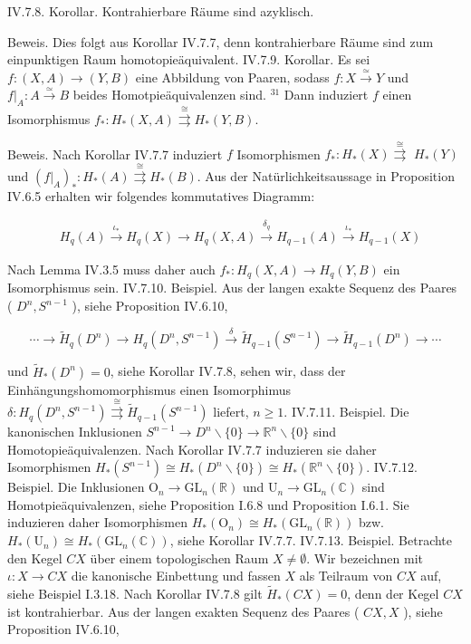 \documentclass[10pt, letterpaper]{article}
\begin{document}
IV.7.8. Korollar. Kontrahierbare Räume sind azyklisch.

Beweis. Dies folgt aus Korollar IV.7.7, denn kontrahierbare Räume sind zum einpunktigen Raum homotopieäquivalent.
IV.7.9. Korollar. Es sei $f:(X, A) \rightarrow(Y, B)$ eine Abbildung von Paaren, sodass $f: X \xrightarrow{\simeq} Y$ und $\left.f\right|_A: A \xrightarrow{\simeq} B$ beides Homotpieäquivalenzen sind. ${ }^{31}$ Dann induziert $f$ einen Isomorphismus $f_*: H_*(X, A) \stackrel{\cong}{\rightrightarrows} H_*(Y, B)$.


Beweis. Nach Korollar IV.7.7 induziert $f$ Isomorphismen $f_*: H_*(X) \stackrel{\cong}{\rightrightarrows}$ $H_*(Y)$ und $\left(\left.f\right|_A\right)_*: H_*(A) \stackrel{\cong}{\rightrightarrows} H_*(B)$. Aus der Natürlichkeitsaussage in Proposition IV.6.5 erhalten wir folgendes kommutatives Diagramm:

$$
\begin{aligned}
& H_q(A) \xrightarrow{\iota_*} H_q(X) \longrightarrow H_q(X, A) \xrightarrow{\delta_q} H_{q-1}(A) \xrightarrow{\iota_*} H_{q-1}(X)
\end{aligned}
$$


Nach Lemma IV.3.5 muss daher auch $f_*: H_q(X, A) \rightarrow H_q(Y, B)$ ein Isomorphismus sein.
IV.7.10. Beispiel. Aus der langen exakte Sequenz des Paares ( $D^n, S^{n-1}$ ), siehe Proposition IV.6.10,

$$
\cdots \rightarrow \tilde{H}_q\left(D^n\right) \rightarrow H_q\left(D^n, S^{n-1}\right) \xrightarrow{\delta} \tilde{H}_{q-1}\left(S^{n-1}\right) \rightarrow \tilde{H}_{q-1}\left(D^n\right) \rightarrow \cdots
$$

und $\tilde{H}_*\left(D^n\right)=0$, siehe Korollar IV.7.8, sehen wir, dass der Einhängungshomomorphismus einen Isomorphimus $\delta: H_q\left(D^n, S^{n-1}\right) \stackrel{\cong}{\rightrightarrows} \tilde{H}_{q-1}\left(S^{n-1}\right)$ liefert, $n \geq 1$.
IV.7.11. Beispiel. Die kanonischen Inklusionen $S^{n-1} \rightarrow D^n \backslash\{0\} \rightarrow \mathbb{R}^n \backslash\{0\}$ sind Homotopieäquivalenzen. Nach Korollar IV.7.7 induzieren sie daher Isomorphismen $H_*\left(S^{n-1}\right) \cong H_*\left(D^n \backslash\{0\}\right) \cong H_*\left(\mathbb{R}^n \backslash\{0\}\right)$.
IV.7.12. Beispiel. Die Inklusionen $\mathrm{O}_n \rightarrow \mathrm{GL}_n(\mathbb{R})$ und $\mathrm{U}_n \rightarrow \mathrm{GL}_n(\mathbb{C})$ sind Homotpieäquivalenzen, siehe Proposition I.6.8 und Proposition I.6.1. Sie induzieren daher Isomorphismen $H_*\left(\mathrm{O}_n\right) \cong H_*\left(\mathrm{GL}_n(\mathbb{R})\right)$ bzw. $H_*\left(\mathrm{U}_n\right) \cong H_*\left(\mathrm{GL}_n(\mathbb{C})\right)$, siehe Korollar IV.7.7.
IV.7.13. Beispiel. Betrachte den Kegel $C X$ über einem topologischen Raum $X \neq \emptyset$. Wir bezeichnen mit $\iota: X \rightarrow C X$ die kanonische Einbettung und fassen $X$ als Teilraum von $C X$ auf, siehe Beispiel I.3.18. Nach Korollar IV.7.8 gilt $\tilde{H}_*(C X)=0$, denn der Kegel $C X$ ist kontrahierbar. Aus der langen exakten Sequenz des Paares ( $C X, X$ ), siehe Proposition IV.6.10,
\end{document}
